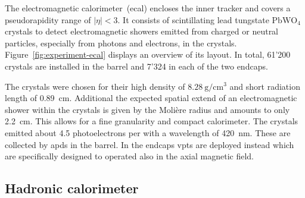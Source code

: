 The electromagnetic calorimeter~(\gls{ecal}) encloses the inner tracker and covers a pseudorapidity range of $|\eta|<3$. It consists of scintillating lead tungstate $\mathrm{PbWO}_{4}$ crystals to detect electromagnetic showers emitted from charged or neutral particles, especially from photons and electrons, in the crystals. Figure~\ref{fig:experiment-ecal} displays an overview of its layout. In total, 61'200 crystals are installed in the barrel and 7'324 in each of the two endcaps.


The crystals were chosen for their high density of $8.28~\mathrm{g}/\mathrm{cm}^{3}$ and short radiation length of 0.89~cm. Additional the expected spatial extend of an electromagnetic shower within the crystals is given by the Moli\`ere radius and amounts to only 2.2~cm. This allows for a fine granularity and compact calorimeter. The crystals emitted about 4.5 photoelectrons per \MeV with a wavelength of 420~nm. These are collected by \glspl{apd} in the barrel. In the endcaps \glspl{vpt} are deployed instead which are specifically designed to operated also in the axial magnetic field.

\subsection{Hadronic calorimeter}

